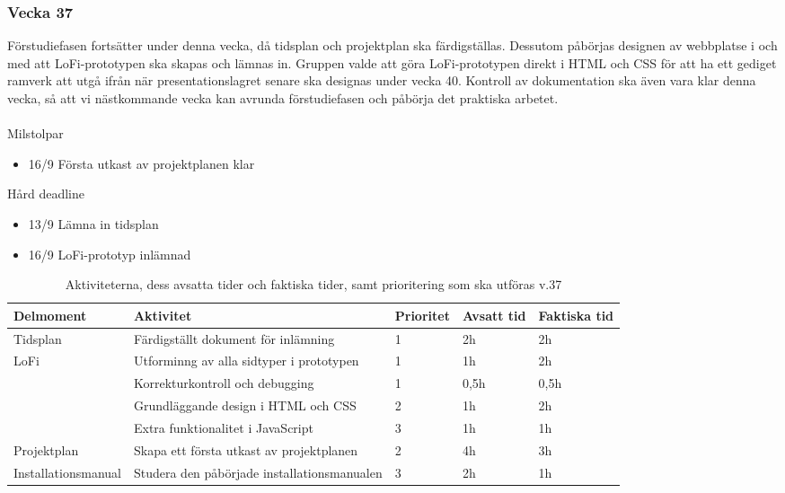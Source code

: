 \documentclass{TDP003mall}
\begin{document}
\pagebreak

\subsubsection*{Vecka 37}

Förstudiefasen fortsätter under denna vecka, då tidsplan och projektplan ska färdigställas. Dessutom påbörjas designen av webbplatse i och med att LoFi-prototypen ska skapas och lämnas in. Gruppen valde att göra LoFi-prototypen direkt i HTML och CSS för att ha ett gediget ramverk att utgå ifrån när presentationslagret senare ska designas under vecka 40. Kontroll av dokumentation ska även vara klar denna vecka, så att vi nästkommande vecka kan avrunda förstudiefasen och påbörja det praktiska arbetet.
\\
\\
Milstolpar
\begin{itemize}
\color{blue}
    \item 16/9 Första utkast av projektplanen klar
\end{itemize}

Hård deadline
\begin{itemize}
\color{red}
    \item 13/9 Lämna in tidsplan

    \item 16/9 LoFi-prototyp inlämnad
\end{itemize}

\begin{table}[h]
\begin{tabularx}{\textwidth}{|l|X|l|l|l|}
\hline
Delmoment  & Aktivitet   & Prioritet  & Avsatt tid & Faktiska tid\\ \hline
    Tidsplan  & Färdigställt dokument för inlämning   & 1   & 2h    & 2h    \\ \hline
    \multirow{4}{*}{LoFi} &  Utforminng av alla sidtyper i prototypen & 1   & 1h    & 2h     \\ \cline{2-5}
             & Korrekturkontroll och debugging   & 1   & 0,5h   & 0,5h   \\ \cline{2-5}
             & Grundläggande design i HTML och CSS     & 2 & 1h   & 2h \\ \cline{2-5}
                & Extra funktionalitet i JavaScript & 3   & 1h   & 1h     \\  \hline
    Projektplan  & Skapa ett första utkast av projektplanen & 2   & 4h   & 3h     \\ \hline
    Installationsmanual & Studera den påbörjade installationsmanualen  & 3 & 2h    & 1h \\ \hline
\end{tabularx}
\centering
    \caption{\label{tab:table-name}Aktiviteterna, dess avsatta tider och faktiska tider, samt prioritering som ska utföras v.37}
\end{table}
\end{document}
